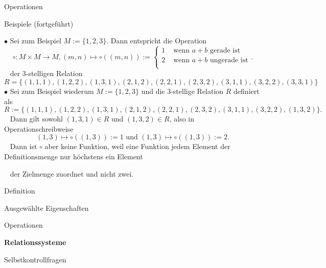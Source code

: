 \documentclass[
  8pt,
  ignorenonframetext,
]{beamer}
\begin{document}
\begin{frame}{Operationen}
\protect\hypertarget{operationen-3}{}
\small

Beispiele (fortgeführt)

\footnotesize

\(\bullet\) Sei zum Beispiel \(M := \{1,2,3\}\). Dann entspricht die
Operation \begin{equation}
\circ : M \times M \to M,
(m,n) \mapsto \circ((m,n)) :=
\begin{cases}
1 & \mbox{ wenn } a + b \mbox{ gerade ist} \\
2 & \mbox{ wenn } a + b \mbox{ ungerade ist} \\
\end{cases}.
\end{equation} \(\,\,\,\) der 3-stelligen Relation \begin{equation}
R = \{(1,1,1), (1,2,2), (1,3,1), (2,1,2), (2,2,1), (2,3,2), (3,1,1), (3,2,2), (3,3,1)\}
\end{equation} \(\bullet\) Sei zum Beispiel wiederum \(M := \{1,2,3\}\)
und die 3-stellige Relation \(R\) definiert als \begin{equation}
R := \{(1,1,1), (1,2,2), (1,3,1), (2,1,2), (2,2,1), (2,3,2), (3,1,1), (3,2,2), (1,3,2)\}.
\end{equation} \(\,\,\,\) Dann gilt sowohl \((1,3,1) \in R\) und
\((1,3,2) \in R\), also in Operationschreibweise \begin{equation}
(1,3) \mapsto \circ((1,3)) := 1 \mbox{ und } (1,3) \mapsto \circ((1,3)) := 2.
\end{equation} \(\,\,\,\) Dann ist \(\circ\) aber keine Funktion, weil
eine Funktion jedem Element der Definitionsmenge nur höchstens ein
Element

\(\,\,\,\) der Zielmenge zuordnet und nicht zwei.
\end{frame}

\begin{frame}{}
\protect\hypertarget{section-6}{}
\vfill
\Large

Definition

Ausgewählte Eigenschaften

Operationen

\textbf{Relationssysteme}

Selbstkontrollfragen \vfill
\end{frame}
\end{document}
